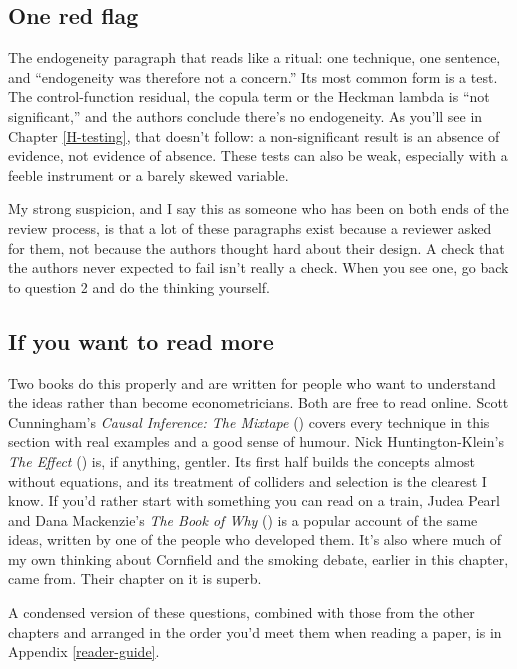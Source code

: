 \documentclass[
]{book}
\begin{document}
\subsection{One red flag}\label{one-red-flag-2}

The endogeneity paragraph that reads like a ritual: one technique, one sentence, and ``endogeneity was therefore not a concern.'' Its most common form is a test. The control-function residual, the copula term or the Heckman lambda is ``not significant,'' and the authors conclude there's no endogeneity. As you'll see in Chapter \ref{H-testing}, that doesn't follow: a non-significant result is an absence of evidence, not evidence of absence. These tests can also be weak, especially with a feeble instrument or a barely skewed variable.

My strong suspicion, and I say this as someone who has been on both ends of the review process, is that a lot of these paragraphs exist because a reviewer asked for them, not because the authors thought hard about their design. A check that the authors never expected to fail isn't really a check. When you see one, go back to question 2 and do the thinking yourself.

\subsection{If you want to read more}\label{if-you-want-to-read-more-2}

Two books do this properly and are written for people who want to understand the ideas rather than become econometricians. Both are free to read online. Scott Cunningham's \emph{Causal Inference: The Mixtape} () covers every technique in this section with real examples and a good sense of humour. Nick Huntington-Klein's \emph{The Effect} () is, if anything, gentler. Its first half builds the concepts almost without equations, and its treatment of colliders and selection is the clearest I know. If you'd rather start with something you can read on a train, Judea Pearl and Dana Mackenzie's \emph{The Book of Why} () is a popular account of the same ideas, written by one of the people who developed them. It's also where much of my own thinking about Cornfield and the smoking debate, earlier in this chapter, came from. Their chapter on it is superb.

A condensed version of these questions, combined with those from the other chapters and arranged in the order you'd meet them when reading a paper, is in Appendix \ref{reader-guide}.
\end{document}
